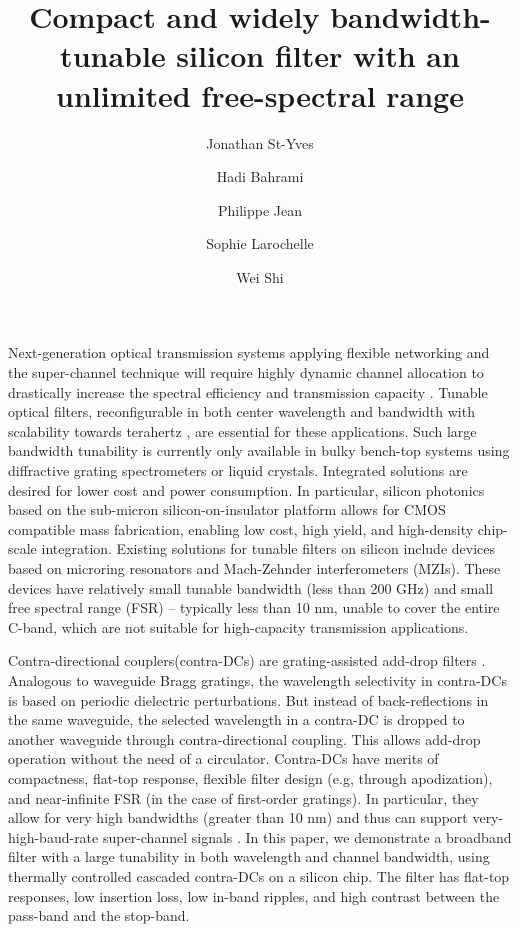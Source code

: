 \documentclass[9pt,twocolumn,twoside]{osajnl}
\title{Compact and widely bandwidth-tunable silicon filter with an unlimited free-spectral range}
\author[1]{Jonathan St-Yves}
\author[1]{Hadi Bahrami}
\author[1]{Philippe Jean}
\author[1]{Sophie Larochelle}
\author[1,*]{Wei Shi}
\affil[1]{Centre d'optique, photonique et laser (COPL) and Département de génie électrique et génie informatique, Université Laval, 2375 rue de la Terrasse, Québec (Québec), Canada, G1V 0A6}
\affil[*]{Corresponding author: wei.shi@gel.ulaval.ca}
\begin{document}
	\maketitle
	\thispagestyle{fancy}
	
	
	Next-generation optical transmission systems applying flexible networking and the super-channel technique will require highly dynamic channel allocation to drastically increase the spectral efficiency and transmission capacity \cite{jinno2009spectrum, geisler2011demonstration}.
	Tunable optical filters, reconfigurable in both center wavelength and bandwidth with scalability towards terahertz \cite{geisler2011demonstration}, are essential for these applications.
	Such large bandwidth tunability is currently only available in bulky bench-top systems using diffractive grating spectrometers or liquid crystals.
	Integrated solutions are desired for lower cost and power consumption.
	In particular, silicon photonics  based on the sub-micron silicon-on-insulator platform allows for CMOS compatible mass fabrication, enabling low cost, high yield, and high-density chip-scale integration.
	Existing solutions for tunable  filters on silicon include devices based on microring resonators \cite{DynamicBW, ong2013ultra} and Mach-Zehnder interferometers (MZIs). These devices have relatively small tunable bandwidth (less than 200 GHz) and small free spectral range (FSR) -- typically less than 10 nm, unable to cover the entire C-band, which are not suitable for high-capacity transmission applications.
	
	Contra-directional couplers(contra-DCs) are grating-assisted add-drop filters \cite{shi2013siliconContraDC}. 
	Analogous to waveguide Bragg gratings, the wavelength selectivity in contra-DCs is based on periodic dielectric perturbations. But instead of back-reflections in the same waveguide, the selected wavelength in a contra-DC is dropped to another waveguide through contra-directional coupling.
	This allows add-drop operation without the need of a circulator. 
	Contra-DCs have merits of compactness, flat-top response, flexible filter design (e.g, through apodization), and near-infinite FSR (in the case of first-order gratings).
	In particular, they allow for very high bandwidths (greater than 10 nm) and thus can support very-high-baud-rate super-channel signals \cite{jinno2009spectrum}.
	In this paper, we demonstrate a broadband filter with a large tunability in both wavelength and channel bandwidth, using thermally controlled cascaded contra-DCs on a silicon chip. 
	The filter has flat-top responses, low insertion loss, low in-band ripples, and high contrast between the pass-band and the stop-band.
	
\end{document}
